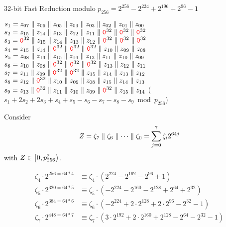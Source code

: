 \begin{algorithm}[H]
\DontPrintSemicolon
\caption{32-bit Fast Reduction modulo $p_{256}=2^{256}-2^{224}+2^{196}+2^{96}-1$}
\BlankLine
{}
\BlankLine
$s_1=z_{07}\parallel z_{06}\parallel z_{05}\parallel z_{04}\parallel z_{03}\parallel z_{02}\parallel z_{01}\parallel z_{00}$\;
$s_2=z_{15}\parallel z_{14}\parallel z_{13}\parallel z_{12}\parallel z_{11}\parallel \textcolor{red}{\texttt{0}}^{32}\parallel \textcolor{red}{\texttt{0}}^{32}\parallel \textcolor{red}{\texttt{0}}^{32}$\;
$s_3=\textcolor{red}{\texttt{0}}^{32}\parallel z_{15}\parallel z_{14}\parallel z_{13}\parallel z_{12}\parallel \textcolor{red}{\texttt{0}}^{32}\parallel \textcolor{red}{\texttt{0}}^{32}\parallel \textcolor{red}{\texttt{0}}^{32}$\;
$s_4= z_{15}\parallel z_{14}\parallel \textcolor{red}{\texttt{0}}^{32}\parallel \textcolor{red}{\texttt{0}}^{32}\parallel \textcolor{red}{\texttt{0}}^{32}\parallel z_{10}\parallel z_{09}\parallel z_{08}$\;
$s_5= z_{08}\parallel z_{13}\parallel z_{15}\parallel z_{14}\parallel z_{13}\parallel z_{11}\parallel z_{10}\parallel z_{09}$\;
$s_6= z_{10}\parallel z_{08}\parallel \textcolor{red}{\texttt{0}}^{32}\parallel \textcolor{red}{\texttt{0}}^{32}\parallel \textcolor{red}{\texttt{0}}^{32}\parallel z_{13}\parallel z_{12}\parallel z_{11}$\;
$s_7= z_{11}\parallel z_{09}\parallel \textcolor{red}{\texttt{0}}^{32}\parallel \textcolor{red}{\texttt{0}}^{32}\parallel z_{15}\parallel z_{14}\parallel z_{13}\parallel z_{12}$\;
$s_8= z_{12}\parallel \textcolor{red}{\texttt{0}}^{32}\parallel z_{10}\parallel z_{09}\parallel z_{08}\parallel z_{15}\parallel z_{14}\parallel z_{13}$\;
$s_9= z_{13}\parallel \textcolor{red}{\texttt{0}}^{32}\parallel z_{11}\parallel z_{10}\parallel z_{09}\parallel \textcolor{red}{\texttt{0}}^{32}\parallel z_{15}\parallel z_{14}$\;
\Return ($s_1+2s_2+2s_3+s_4+s_5-s_6-s_7-s_8-s_9\bmod{p_{256}}$)\;
\end{algorithm}

\newpage
\noindent Consider \begin{align*}
Z=\zeta_{7}\parallel \zeta_{6}\parallel\cdots\parallel \zeta_0=\sum_{j=0}^{7}\zeta_i2^{64j}
\end{align*} with $Z\in\intco{0, p_{256}^2}$.

\begin{align*}
	\zeta_4\cdot 2^{256=64*4} &\equiv \zeta_4\cdot (2^{224} - 2^{192} - 2^{96} + 1) \\
	\zeta_{5}\cdot 2^{320=64*5} &\equiv \zeta_{5}\cdot (- 2^{224} - 2^{160} - 2^{128} + 2^{64} + 2^{32}) \\
	\zeta_{6}\cdot 2^{384=64*6} &\equiv \zeta_{6}\cdot (- 2^{224} + 2\cdot 2^{128} + 2\cdot 2^{96} - 2^{32} - 1) \\
	\zeta_{7}\cdot 2^{448=64*7} &\equiv \zeta_{7}\cdot (3\cdot 2^{192} + 2\cdot 2^{160} + 2^{128} - 2^{64} - 2^{32} - 1) \\
\end{align*}

